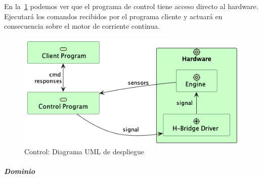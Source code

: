 En la~\cref{fig:Control-Diagrama UML de despliegue} podemos ver que el programa de control tiene acceso directo al hardware. Ejecutará los comandos recibidos por el programa cliente y actuará en consecuencia sobre el motor de corriente continua.

%

\begin{figure}[H]
    \centering
    \includegraphics[height=0.2\textheight]{./part/Proyecto_ejecutivo/memoria_descriptiva/descripcionDelProyecto/control/uml/controlConcept}
    \caption{Control: Diagrama UML de despliegue}\label{fig:Control-Diagrama UML de despliegue}
\end{figure}

\subparagraph{Dominio}

